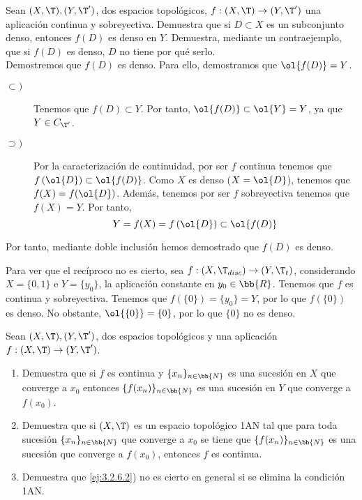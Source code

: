 \begin{ejercicio}
    Sean $(X, \T ), (Y, \T')$, dos espacios topológicos, $f : (X, \T ) \to (Y, \T')$ una aplicación continua y sobreyectiva. Demuestra que si $D \subset X$ es un subconjunto denso, entonces $f(D)$ es denso en $Y$. Demuestra, mediante un contraejemplo, que si $f(D)$ es denso, $D$ no tiene por qué serlo.\\

    Demostremos que $f(D)$ es denso. Para ello, demostramos que $\ol{f(D)}=Y$.
    \begin{description}
        \item[$\subset)$] Tenemos que $f(D)\subset Y$. Por tanto, $\ol{f(D)}\subset \ol{Y}=Y$, ya que $Y\in C_{\T'}$.

        \item[$\supset)$] Por la caracterización de continuidad, por ser $f$ continua tenemos que $f\left(\ol{D}\right)\subset \ol{f(D)}$. Como $X$ es denso ($X=\ol{D}$), tenemos que $f(X)=f(\ol{D})$. Además, tenemos por ser $f$ sobreyectiva tenemos que $f(X)=Y$. Por tanto,
        \begin{equation*}
            Y=f(X)=f\left(\ol{D}\right)\subset \ol{f(D)}
        \end{equation*}
    \end{description}
    Por tanto, mediante doble inclusión hemos demostrado que $f(D)$ es denso.  
    
    Para ver que el recíproco no es cierto, sea $f:(X,\T_{disc})\to (Y, \T_t)$, considerando $X=\{0,1\}$ e $Y=\{y_0\}$, la aplicación constante en $y_0\in \bb{R}$. Tenemos que $f$ es continua y sobreyectiva. Tenemos que $f(\{0\})=\{y_0\}=Y$, por lo que $f(\{0\})$ es denso. No obstante, $\ol{\{0\}}=\{0\}$, por lo que $\{0\}$ no es denso.
\end{ejercicio}

\begin{ejercicio}
    Sean $(X, \T ), (Y, \T')$, dos espacios topológicos y una aplicación $f : (X, \T ) \to (Y, \T')$.
    \begin{enumerate}
        \item Demuestra que si $f$ es continua y $\{x_n\}_{n\in \bb{N}}$ es una sucesión en $X$ que converge a $x_0$ entonces $\{f(x_n)\}_{n\in \bb{N}}$ es una sucesión en $Y$ que converge a $f(x_0)$.
    
        \item \label{ej:3.2.6.2}  Demuestra que si $(X, \T )$ es un espacio topológico 1AN tal que para toda sucesión
        $\{x_n\}_{n\in \bb{N}}$ que converge a $x_0$ se tiene que $\{f(x_n)\}_{n\in \bb{N}}$ es una sucesión que converge a $f(x_0)$, entonces $f$ es continua.
    
        \item Demuestra que \ref{ej:3.2.6.2}) no es cierto en general si se elimina la condición 1AN.
    \end{enumerate}
\end{ejercicio}

